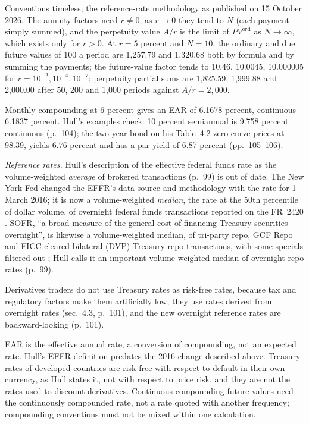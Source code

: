 \begin{qfdefinition}
 Conventions timeless; the reference-rate methodology as published on 15 October 2026. The annuity factors need $r\neq0$; as $r\to0$ they tend to $N$ (each payment simply summed), and the perpetuity value $A/r$ is the limit of $PV^{\mathrm{ord}}$ as $N\to\infty$, which exists only for $r>0$. At $r=5$ percent and $N=10$, the ordinary and due future values of 100 a period are 1{,}257.79 and 1{,}320.68 both by formula and by summing the payments; the future-value factor tends to 10.46, 10.0045, 10.000005 for $r=10^{-2},10^{-4},10^{-7}$; perpetuity partial sums are 1{,}825.59, 1{,}999.88 and 2{,}000.00 after 50, 200 and 1{,}000 periods against $A/r=2{,}000$.

Monthly compounding at 6 percent gives an EAR of 6.1678 percent, continuous 6.1837 percent. Hull's examples check: 10 percent semiannual is 9.758 percent continuous (p.~104); the two-year bond on his Table~4.2 zero curve prices at 98.39, yields 6.76 percent and has a par yield of 6.87 percent (pp.~105--106).

 \emph{Reference rates.} Hull's description of the effective federal funds rate as the volume-weighted \emph{average} of brokered transactions (p.~99) is out of date. The New York Fed changed the EFFR's data source and methodology with the rate for 1 March 2016; it is now a volume-weighted \emph{median}, the rate at the 50th percentile of dollar volume, of overnight federal funds transactions reported on the FR~2420 \citep[EFFR and OBFR methodology]{exp-sofr-data}. SOFR, ``a broad measure of the general cost of financing Treasury securities overnight'', is likewise a volume-weighted median, of tri-party repo, GCF Repo and FICC-cleared bilateral (DVP) Treasury repo transactions, with some specials filtered out \citep[SOFR description]{exp-sofr-data}; Hull calls it an important volume-weighted median of overnight repo rates (p.~99).

Derivatives traders do not use Treasury rates as risk-free rates, because tax and regulatory factors make them artificially low; they use rates derived from overnight rates (sec.~4.3, p.~101), and the new overnight reference rates are backward-looking (p.~101).

 EAR is the effective annual rate, a conversion of compounding, not an expected rate. Hull's EFFR definition predates the 2016 change described above. Treasury rates of developed countries are risk-free with respect to default in their own currency, as Hull states it, not with respect to price risk, and they are not the rates used to discount derivatives. Continuous-compounding future values need the continuously compounded rate, not a rate quoted with another frequency; compounding conventions must not be mixed within one calculation.


\end{qfdefinition}
